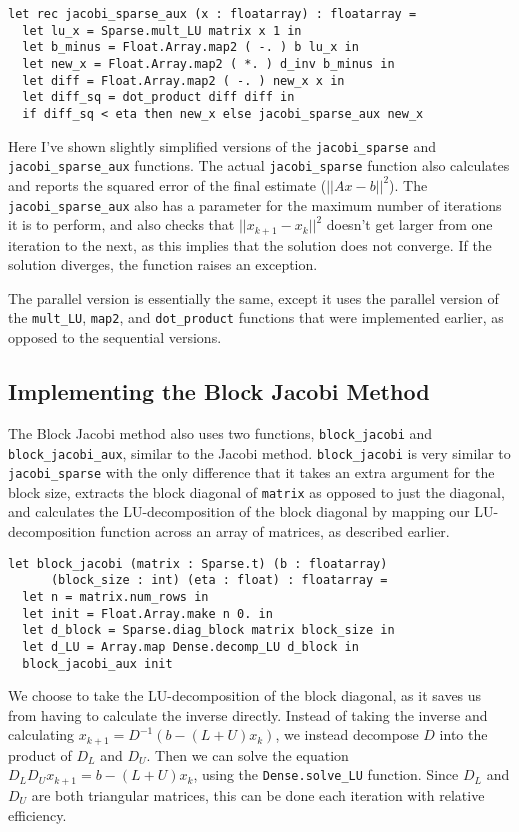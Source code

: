 \documentclass[pageno]{jpaper}
\begin{document}
\begin{doublespacing}
\begin{verbatim}
let rec jacobi_sparse_aux (x : floatarray) : floatarray = 
  let lu_x = Sparse.mult_LU matrix x 1 in
  let b_minus = Float.Array.map2 ( -. ) b lu_x in
  let new_x = Float.Array.map2 ( *. ) d_inv b_minus in 
  let diff = Float.Array.map2 ( -. ) new_x x in
  let diff_sq = dot_product diff diff in
  if diff_sq < eta then new_x else jacobi_sparse_aux new_x
\end{verbatim}

Here I've shown slightly simplified versions of the \verb|jacobi_sparse| and \verb|jacobi_sparse_aux| functions. The actual \verb|jacobi_sparse| function also calculates and reports the squared error of the final estimate ($||Ax - b||^2$). The \verb|jacobi_sparse_aux| also has a parameter for the maximum number of iterations it is to perform, and also checks that $||x_{k + 1} - x_k||^2$ doesn't get larger from one iteration to the next, as this implies that the solution does not converge. If the solution diverges, the function raises an exception.

The parallel version is essentially the same, except it uses the parallel version of the \verb|mult_LU|, \verb|map2|, and \verb|dot_product| functions that were implemented earlier, as opposed to the sequential versions.

\subsection{Implementing the Block Jacobi Method}
The Block Jacobi method also uses two functions, \verb|block_jacobi| and \verb|block_jacobi_aux|, similar to the Jacobi method. \verb|block_jacobi| is very similar to \verb|jacobi_sparse| with the only difference that it takes an extra argument for the block size, extracts the block diagonal of \verb|matrix| as opposed to just the diagonal, and calculates the LU-decomposition of the block diagonal by mapping our LU-decomposition function across an array of matrices, as described earlier. 

\begin{verbatim}
let block_jacobi (matrix : Sparse.t) (b : floatarray) 
      (block_size : int) (eta : float) : floatarray =
  let n = matrix.num_rows in
  let init = Float.Array.make n 0. in
  let d_block = Sparse.diag_block matrix block_size in
  let d_LU = Array.map Dense.decomp_LU d_block in
  block_jacobi_aux init
\end{verbatim}

We choose to take the LU-decomposition of the block diagonal, as it saves us from having to calculate the inverse directly. Instead of taking the inverse and calculating $x_{k + 1} = D^{-1}(b - (L + U)x_k)$, we instead decompose $D$ into the product of $D_L$ and $D_U$. Then we can solve the equation $D_L D_U x_{k + 1} = b - (L + U) x_k$, using the \verb|Dense.solve_LU| function. Since $D_L$ and $D_U$ are both triangular matrices, this can be done each iteration with relative efficiency.


\end{doublespacing}
\end{document}
